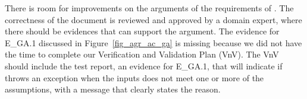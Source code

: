 There is room for improvements on the arguments of the requirements of \progname{}. The correctness of the document is reviewed and approved by a domain expert, where there should be evidences that can support the argument. The evidence for  E\_GA.1 discussed in Figure~\ref{fig_agr_ac_ga} is missing because we did not have the time to complete our Verification and Validation Plan (VnV). The VnV should include the test report, an evidence for E\_GA.1, that will indicate if \progname{} throws an exception when the inputs does not meet one or more of the assumptions, with a message that clearly states the reason.